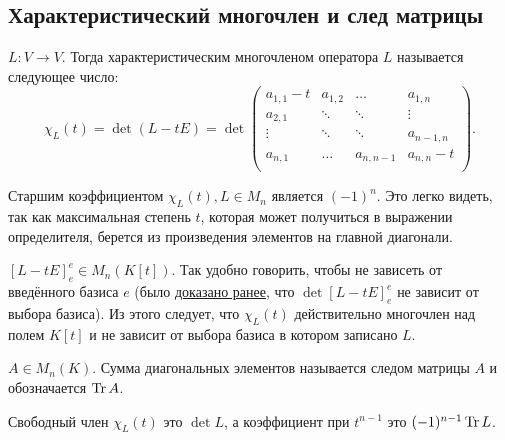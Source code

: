\subsection{Характеристический многочлен и след матрицы}
\begin{definition}
    $L\colon V\rightarrow V$. Тогда характеристическим многочленом
    оператора $L$ называется следующее число:
    \[
        \chi_L(t) = \det(L - tE) = 
        \det \begin{pmatrix}
            a_{1,1}-t&a_{1,2}&\dots&a_{1,n}\\
            a_{2,1} & \ddots & \ddots& \vdots\\
            \vdots & \ddots & \ddots& a_{n-1,n}\\
            a_{n,1} & \dots & a_{n,n-1}& a_{n,n}-t\\
        \end{pmatrix}
    .\] 
\end{definition}
\begin{remark}
    Старшим коэффициентом $\chi_L(t), L\in M_n$ является $(-1)^n$.
    Это легко видеть, так как максимальная степень $t$, которая может получиться в выражении 
    определителя, берется из произведения элементов на главной диагонали.
\end{remark}
\begin{remark}
    \label{rem:Характеристический многочлен не зависит от базиса}
    $[L - tE]^e_e \in M_n\left(K[t]\right)$. Так удобно говорить,
    чтобы не зависеть от введённого базиса $e$ 
    (было \hyperref[def:определитель отображения]{доказано ранее}, что 
    $\det [L - t E]^e_e$ не зависит от выбора базиса).
    Из этого следует, что $\chi_L(t)$ действительно многочлен над полем $K[t]$ и не зависит
    от выбора базиса в котором записано $L$.
\end{remark}
\begin{definition}
    $A\in M_n(K)$. Сумма диагональных элементов называется следом матрицы $A$ и обозначается $\operatorname{Tr} A$.
\end{definition}
\begin{remark}
    Свободный член $\chi_L(t)$ это $\det L$, а коэффициент при $t^{n-1}$ это $(-1)^{n-1} \operatorname{Tr} L$.
\end{remark}
